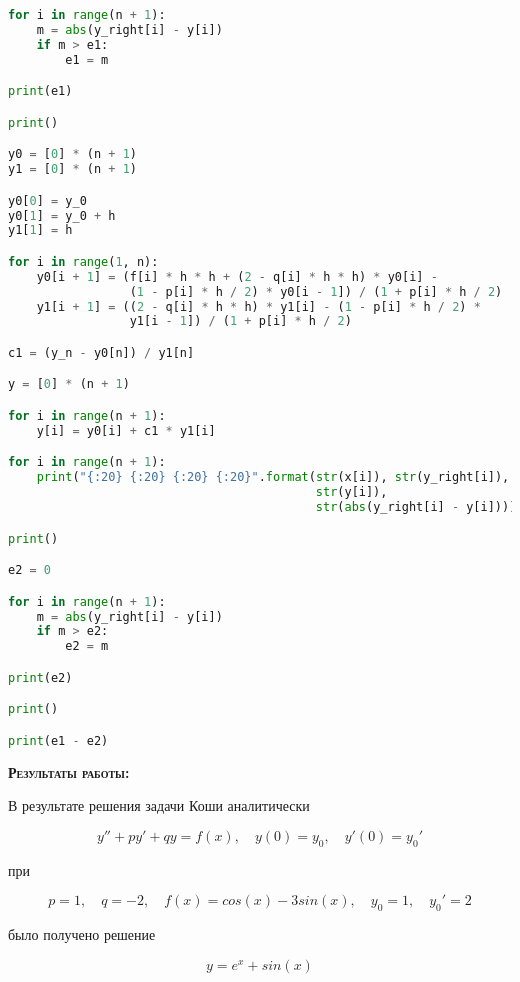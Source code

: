 \documentclass [12pt]{article}
\begin{document}
\begin{lstlisting}[language=python]
for i in range(n + 1):
    m = abs(y_right[i] - y[i])
    if m > e1:
        e1 = m

print(e1)

print()

y0 = [0] * (n + 1)
y1 = [0] * (n + 1)

y0[0] = y_0
y0[1] = y_0 + h
y1[1] = h

for i in range(1, n):
    y0[i + 1] = (f[i] * h * h + (2 - q[i] * h * h) * y0[i] -
                 (1 - p[i] * h / 2) * y0[i - 1]) / (1 + p[i] * h / 2)
    y1[i + 1] = ((2 - q[i] * h * h) * y1[i] - (1 - p[i] * h / 2) *
                 y1[i - 1]) / (1 + p[i] * h / 2)

c1 = (y_n - y0[n]) / y1[n]

y = [0] * (n + 1)

for i in range(n + 1):
    y[i] = y0[i] + c1 * y1[i]

for i in range(n + 1):
    print("{:20} {:20} {:20} {:20}".format(str(x[i]), str(y_right[i]),
                                           str(y[i]),
                                           str(abs(y_right[i] - y[i]))))

print()

e2 = 0

for i in range(n + 1):
    m = abs(y_right[i] - y[i])
    if m > e2:
        e2 = m

print(e2)

print()

print(e1 - e2)

\end{lstlisting}


\textsc{\textbf{Результаты работы:}}

В результате решения задачи Коши аналитически

$$y'' + py' + qy = f(x), \quad y(0) = y_0, \quad y'(0) = y_0'$$

при

$$p = 1, \quad q = -2, \quad f(x) = cos(x) - 3sin(x), \quad y_0 = 1, \quad y_0' = 2$$

было получено решение

$$y = e^x + sin(x)$$
\end{document}
